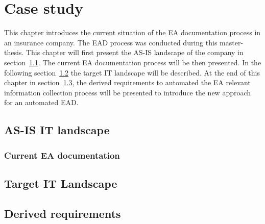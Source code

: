 

\chapter{Case study}\label{chapter:EA documentation in an insurance company} 

This chapter introduces the current situation of the EA documentation process in an insurance company. The EAD process was conducted during this  master-thesis. 
This chapter will first present the AS-IS landscape of the company in section~\ref{section:asislandscape}. The current EA documentation process will be then presented.
In the following section~\ref{section:targetitlandscape} the target IT landscape will be described.
At the end of this chapter in section~\ref{section:derivedrequirements}, the derived requirements to automated the EA relevant information collection process will be presented to introduce the new approach for an automated EAD.

\section{AS-IS IT landscape}\label{section:asislandscape}

\subsection{Current EA documentation}\label{subsection:currentead}

\section{Target IT Landscape}\label{section:targetitlandscape}

\section{Derived requirements}\label{section:derivedrequirements}











